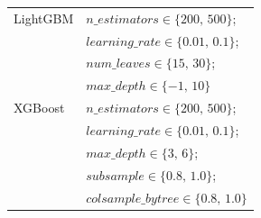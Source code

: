 \documentclass{article}
\begin{document}
\begin{longtable}{>{\raggedright\arraybackslash}p{3.5cm} >{\raggedright\arraybackslash}p{10.2cm}}
LightGBM &
$n\_estimators \in \{200,\,500\}$; \\
& $learning\_rate \in \{0.01,\,0.1\}$; \\
& $num\_leaves \in \{15,\,30\}$; \\
& $max\_depth \in \{-1,\,10\}$ \\[0.4em]

XGBoost &
$n\_estimators \in \{200,\,500\}$; \\
& $learning\_rate \in \{0.01,\,0.1\}$; \\
& $max\_depth \in \{3,\,6\}$; \\
& $subsample \in \{0.8,\,1.0\}$; \\
& $colsample\_bytree \in \{0.8,\,1.0\}$ \\

\end{longtable}
\end{document}
